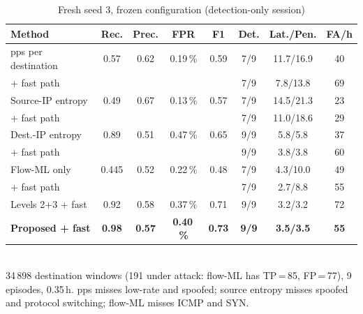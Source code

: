 \documentclass[conference]{IEEEtran}
\begin{document}
\begin{table}[t]
\caption{Fresh seed 3, frozen configuration (detection-only session)}
\label{tab:seed3}
\centering
\setlength{\tabcolsep}{1.8pt}
\begin{tabular}{lccccccc}
\toprule
Method & Rec. & Prec. & FPR & F1 & Det. & Lat./Pen. & FA/h \\
\midrule
pps per destination & 0.57 & 0.62 & 0.19\,\% & 0.59 & 7/9 & 11.7/16.9 & 40 \\
\quad + fast path & & & & & 7/9 & 7.8/13.8 & 69 \\
Source-IP entropy & 0.49 & 0.67 & 0.13\,\% & 0.57 & 7/9 & 14.5/21.3 & 23 \\
\quad + fast path & & & & & 7/9 & 11.0/18.6 & 29 \\
Dest.-IP entropy & 0.89 & 0.51 & 0.47\,\% & 0.65 & 9/9 & 5.8/5.8 & 37 \\
\quad + fast path & & & & & 9/9 & 3.8/3.8 & 60 \\
Flow-ML only & 0.445 & 0.52 & 0.22\,\% & 0.48 & 7/9 & 4.3/10.0 & 49 \\
\quad + fast path & & & & & 7/9 & 2.7/8.8 & 55 \\
Levels 2+3 + fast & 0.92 & 0.58 & 0.37\,\% & 0.71 & 9/9 & 3.2/3.2 & 72 \\
\textbf{Proposed + fast} & \textbf{0.98} & \textbf{0.57} & \textbf{0.40\,\%} & \textbf{0.73} & \textbf{9/9} & \textbf{3.5/3.5} & \textbf{55} \\
\bottomrule
\end{tabular}\\[2pt]
\footnotesize 34\,898 destination windows (191 under attack: flow-ML has TP\,=\,85, FP\,=\,77), 9 episodes, 0.35\,h. pps misses low-rate and spoofed; source entropy misses spoofed and protocol switching; flow-ML misses ICMP and SYN.
\end{table}
\end{document}
